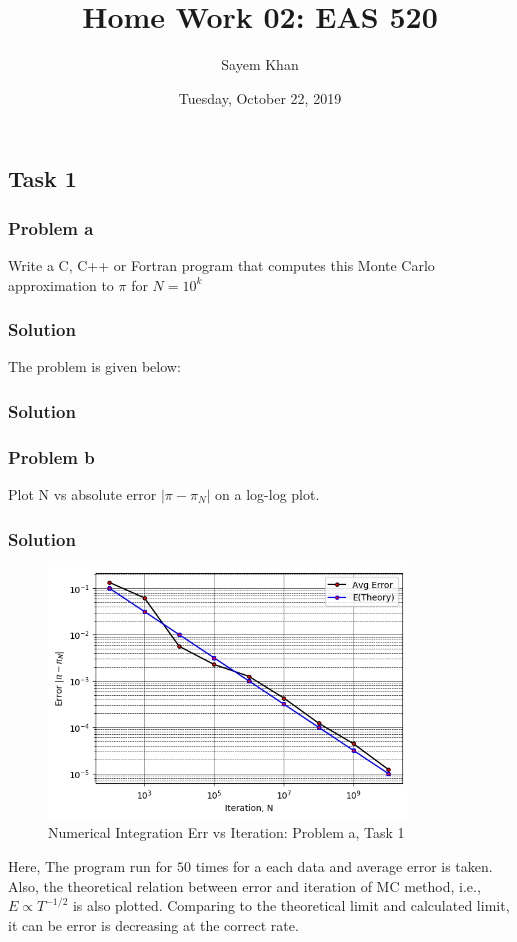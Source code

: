 \documentclass{article}
\title{Home Work 02: EAS 520}
\author{Sayem Khan}
\date{Tuesday, October 22, 2019}
\begin{document}
\maketitle
\subsection*{Task 1}
\subsubsection*{Problem a} 
Write a C, C++ or Fortran program that computes this Monte Carlo approximation to $\pi$ for $N = 10^k$
\subsubsection*{Solution}
The problem is given below:
\subsubsection*{Solution}



\subsubsection*{Problem b } 
Plot N vs absolute error $|\pi - \pi_N|$ on a log-log plot.  
\subsubsection*{Solution}
\begin{figure}[h!]
  \centering
    \includegraphics[width=0.85\textwidth]{avg_Err_vs_Iteration.png}
    \caption{Numerical Integration Err vs Iteration: Problem a, Task 1} 
    \label{t1a}
\end{figure}
Here, The program run for $50$ times for a each data and average error is taken. Also, the theoretical relation between error and iteration of MC method, i.e., $E\propto T^{-1/2}$ is also plotted. Comparing to the theoretical limit and calculated limit, it can be error is decreasing at the correct rate.

\end{document}
